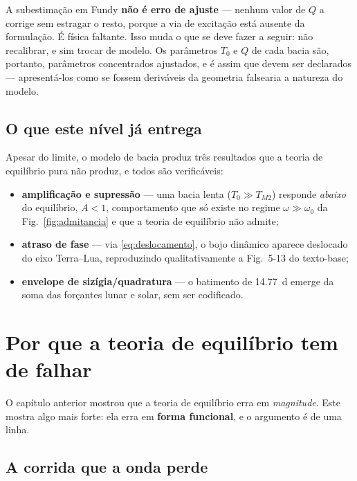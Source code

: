 \documentclass[11pt,a4paper,oneside]{report}
\theoremstyle{definition}
\theoremstyle{plain}
\theoremstyle{remark}
\begin{document}
\begin{caixa}
A subestimação em Fundy \textbf{não é erro de ajuste} — nenhum valor de $Q$ a
corrige sem estragar o resto, porque a via de excitação está ausente da
formulação. É física faltante. Isso muda o que se deve fazer a seguir: não
recalibrar, e sim trocar de modelo. Os parâmetros $T_0$ e $Q$ de cada bacia
são, portanto, parâmetros concentrados ajustados, e é assim que devem ser
declarados — apresentá-los como se fossem deriváveis da geometria falsearia a
natureza do modelo.
\end{caixa}

\section{O que este nível já entrega}

Apesar do limite, o modelo de bacia produz três resultados que a teoria de
equilíbrio pura não produz, e todos são verificáveis:

\begin{itemize}
\item \textbf{amplificação e supressão} — uma bacia lenta ($T_0\gg T_{M2}$)
  responde \emph{abaixo} do equilíbrio, $A<1$, comportamento que só existe no
  regime $\omega\gg\omega_0$ da Fig.~\ref{fig:admitancia} e que a teoria de
  equilíbrio não admite;
\item \textbf{atraso de fase} — via \eqref{eq:deslocamento}, o bojo dinâmico
  aparece deslocado do eixo Terra--Lua, reproduzindo qualitativamente a
  Fig.~5-13 do texto-base;
\item \textbf{envelope de sizígia/quadratura} — o batimento de \SI{14.77}{\day}
  emerge da soma das forçantes lunar e solar, sem ser codificado.
\end{itemize}

\chapter{Por que a teoria de equilíbrio tem de falhar}
\label{cap:falha}

O capítulo anterior mostrou que a teoria de equilíbrio erra em \emph{magnitude}.
Este mostra algo mais forte: ela erra em \textbf{forma funcional}, e o
argumento é de uma linha.

\section{A corrida que a onda perde}
\label{sec:corrida}
\end{document}

